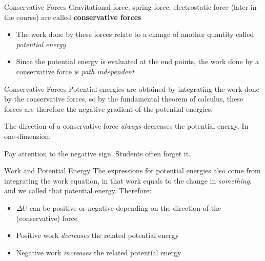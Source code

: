 \documentclass[12pt,compress,aspectratio=169]{beamer}
\newcommand{\mb}[1]{\ensuremath\mathbf{#1}}
\newcommand{\eq}[2]{\vspace{#1}{\Large\begin{displaymath}#2\end{displaymath}}}
\begin{document}
\begin{frame}{Conservative Forces}
  Gravitational force, spring force, electrostatic force (later in the
  course) are called \textbf{conservative forces}
  \begin{itemize}
  \item The work done by these forces relate to a change of another quantity
    called \emph{potential energy}
  \item Since the potential energy is evaluated at the end points, the work
    done by a conservative force is \emph{path independent}
  \end{itemize}
\end{frame}



\begin{frame}{Conservative Forces}
  Potential energies are obtained by integrating the work done by the
  conservative forces, so by the fundamental theorem of calculus, these forces
  are therefore the negative gradient of the potential energies:

  \eq{-.2in}{
    \mb{F}=-\nabla U=
    -\frac{\partial U}{\partial x}\bm{\hat{\imath}}
    -\frac{\partial U}{\partial y}\bm{\hat{\jmath}}
    -\frac{\partial U}{\partial z}\hat{\bm{k}}
  }

  The direction of a conservative force \emph{always} decreases the potential
  energy. In one-dimension:

  \eq{-.2in}{
    \boxed{
      F=-\frac{dU}{dx}
    }
  }

  Pay attention to the negative sign. Students often forget it.
\end{frame}




\begin{frame}{Work and Potential Energy}
  The expressions for potential energies also come from integrating the work
  equation, in that work equals to the change in \emph{something}, and we
  called that potential energy. Therefore:

  \eq{-.2in}{
    \boxed{
      W_c=-\Delta U
    }
  }
  \begin{itemize}
  \item\vspace{-.15in}$\Delta U$ can be positive or negative depending on the
    direction of the (conservative) force
  \item Positive work \emph{decreases} the related potential energy
  \item Negative work \emph{increases} the related potential energy
  \end{itemize}
\end{frame}
\end{document}
